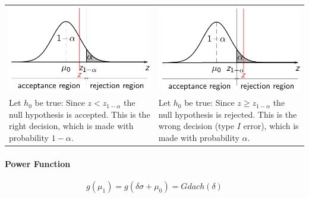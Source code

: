  \begin{table}[H]
   \setlength{\tabcolsep}{0em}
   \small
   \begin{tabular}{p{}p{}}
    \includegraphics[width=\linewidth]{Pics/3.2.1.png}& \includegraphics[width=\linewidth]{Pics/3.2.2.png} \\
    Let $h_0$ be true: Since $z < z_{1-\alpha}$ the null hypothesis is accepted. This is the right decision, which is made with probability $1-\alpha$. & Let $h_0$ be true: Since $z \geq z_{1-\alpha}$ the null hypothesis is rejected. This is the wrong decision (type $I$ error), which is made with probability $\alpha$.
  \end{tabular}
 \end{table}

\paragraph{Power Function}
\begin{equation}
  g(\mu_1) = g(\delta\sigma + \mu_0) = G dach (\delta)
\end{equation}

